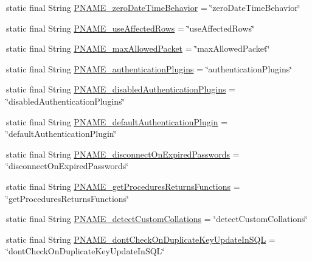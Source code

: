 \begin{DoxyCompactItemize}
\item 
static final String \mbox{\hyperlink{classcom_1_1mysql_1_1cj_1_1conf_1_1_property_definitions_a29e848df762607444b9961d804ebfe04}{P\+N\+A\+M\+E\+\_\+zero\+Date\+Time\+Behavior}} = \char`\"{}zero\+Date\+Time\+Behavior\char`\"{}
\item 
static final String \mbox{\hyperlink{classcom_1_1mysql_1_1cj_1_1conf_1_1_property_definitions_a4f1a7f330a32c03213a89e8e5c969028}{P\+N\+A\+M\+E\+\_\+use\+Affected\+Rows}} = \char`\"{}use\+Affected\+Rows\char`\"{}
\item 
static final String \mbox{\hyperlink{classcom_1_1mysql_1_1cj_1_1conf_1_1_property_definitions_a12f43563b2f4047d96e88f0b90244c83}{P\+N\+A\+M\+E\+\_\+max\+Allowed\+Packet}} = \char`\"{}max\+Allowed\+Packet\char`\"{}
\item 
static final String \mbox{\hyperlink{classcom_1_1mysql_1_1cj_1_1conf_1_1_property_definitions_af67c9f06e1c400a154e85fba3fd8b9bc}{P\+N\+A\+M\+E\+\_\+authentication\+Plugins}} = \char`\"{}authentication\+Plugins\char`\"{}
\item 
static final String \mbox{\hyperlink{classcom_1_1mysql_1_1cj_1_1conf_1_1_property_definitions_a0ec19d37227a630405c73fffa35364cf}{P\+N\+A\+M\+E\+\_\+disabled\+Authentication\+Plugins}} = \char`\"{}disabled\+Authentication\+Plugins\char`\"{}
\item 
static final String \mbox{\hyperlink{classcom_1_1mysql_1_1cj_1_1conf_1_1_property_definitions_a72a1e46c50c1917022b9ffe7a68f88b2}{P\+N\+A\+M\+E\+\_\+default\+Authentication\+Plugin}} = \char`\"{}default\+Authentication\+Plugin\char`\"{}
\item 
static final String \mbox{\hyperlink{classcom_1_1mysql_1_1cj_1_1conf_1_1_property_definitions_abf3c7c45ecf2dfc204a1da7553d83be2}{P\+N\+A\+M\+E\+\_\+disconnect\+On\+Expired\+Passwords}} = \char`\"{}disconnect\+On\+Expired\+Passwords\char`\"{}
\item 
static final String \mbox{\hyperlink{classcom_1_1mysql_1_1cj_1_1conf_1_1_property_definitions_a84c685723d365050673daed9b28b6f30}{P\+N\+A\+M\+E\+\_\+get\+Procedures\+Returns\+Functions}} = \char`\"{}get\+Procedures\+Returns\+Functions\char`\"{}
\item 
static final String \mbox{\hyperlink{classcom_1_1mysql_1_1cj_1_1conf_1_1_property_definitions_a3d19cb79397cc5b9c6ca7269520f132c}{P\+N\+A\+M\+E\+\_\+detect\+Custom\+Collations}} = \char`\"{}detect\+Custom\+Collations\char`\"{}
\item 
static final String \mbox{\hyperlink{classcom_1_1mysql_1_1cj_1_1conf_1_1_property_definitions_a666c09b4c6daf6dd64f031ef0171ba4a}{P\+N\+A\+M\+E\+\_\+dont\+Check\+On\+Duplicate\+Key\+Update\+In\+S\+QL}} = \char`\"{}dont\+Check\+On\+Duplicate\+Key\+Update\+In\+S\+QL\char`\"{}

\end{DoxyCompactItemize}

